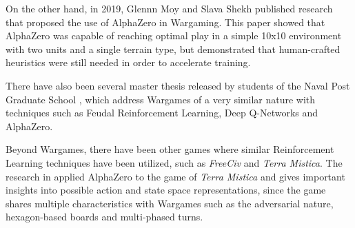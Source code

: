 On the other hand, in 2019, Glennn Moy and Slava Shekh published  research~\cite{Alpha_wargames} that proposed the use of AlphaZero in Wargaming. This paper showed that AlphaZero was capable of reaching optimal play in a simple 10x10 environment with two units and a single terrain type, but demonstrated that human-crafted heuristics were still needed in order to accelerate training.

There have also been several master thesis released by students of the Naval Post Graduate School \cite{cnn_combat_nps,naval_movement_rl_nps,feudal_rl_nps}, which address Wargames of a very similar nature with techniques such as Feudal Reinforcement Learning, Deep Q-Networks and AlphaZero.

Beyond Wargames, there have been other games where similar Reinforcement Learning techniques have been utilized, such as \textit{FreeCiv} \cite{free_civ_paper} and \textit{Terra Mistica}. The research in \cite{AlphaTM} applied AlphaZero to the game of \textit{Terra Mistica} and gives important insights into possible action and state space representations, since the game shares multiple characteristics with Wargames such as the adversarial nature, hexagon-based boards and multi-phased turns.


